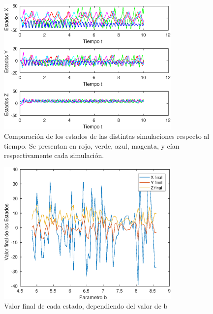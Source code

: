 \documentclass[12pt,letterpaper]{article}
\begin{document}

\begin{figure}
	\centering
	\includegraphics[width=0.8\textwidth]{pictures/comparacion}
	\caption[justification=centering]{Comparación de los estados de las distintas simulaciones respecto al tiempo. Se presentan en rojo, verde, azul, magenta, y cían respectivamente cada simulación.}

	\label{fig:comparacion}
\end{figure}



\begin{figure}
	\centering
	\includegraphics[width=0.8\textwidth]{pictures/sensibilidad}
	\caption{Valor final de cada estado, dependiendo del valor de b}
	\label{fig:sensibilidad}
\end{figure}
\end{document}
